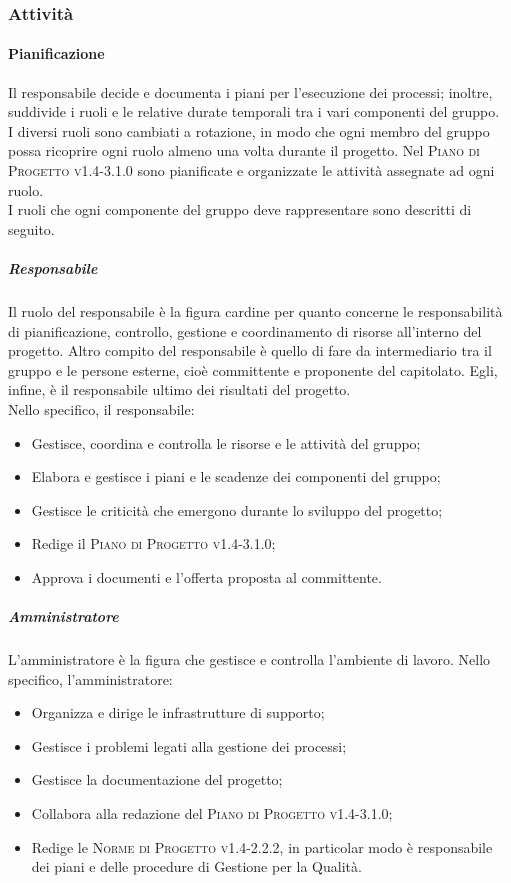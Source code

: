 \subsubsection{Attività}
\paragraph{Pianificazione}
Il responsabile decide e documenta i piani per l'esecuzione dei processi; inoltre, suddivide i ruoli e le relative durate temporali tra i vari componenti del gruppo. \\
I diversi ruoli sono cambiati a rotazione, in modo che ogni membro del gruppo possa ricoprire ogni ruolo almeno una volta durante il progetto. Nel \textsc{Piano di Progetto v1.4-3.1.0} sono pianificate e organizzate le attività assegnate ad ogni ruolo. \\
I ruoli che ogni componente del gruppo deve rappresentare sono descritti di seguito.
\subparagraph{Responsabile}
Il ruolo del responsabile è la figura cardine per quanto concerne le responsabilità di pianificazione, controllo, gestione e coordinamento di risorse all'interno del progetto. Altro compito del responsabile è quello di fare da intermediario tra il gruppo e le persone esterne, cioè committente e proponente del capitolato. Egli, infine, è il responsabile ultimo dei risultati del progetto. \\
Nello specifico, il responsabile:
\begin{itemize}
  \item Gestisce, coordina e controlla le risorse e le attività del gruppo;
  \item Elabora e gestisce i piani e le scadenze dei componenti del gruppo;
  \item Gestisce le criticità che emergono durante lo sviluppo del progetto;
  \item Redige il \textsc{Piano di Progetto v1.4-3.1.0};
  \item Approva i documenti e l'offerta proposta al committente.
\end{itemize}

\subparagraph{Amministratore}
L'amministratore è la figura che gestisce e controlla l'ambiente di lavoro. Nello specifico, l'amministratore:
\begin{itemize}
  \item Organizza e dirige le infrastrutture di supporto;
  \item Gestisce i problemi legati alla gestione dei processi;
  \item Gestisce la documentazione del progetto;
  \item Collabora alla redazione del \textsc{Piano di Progetto v1.4-3.1.0};
  \item Redige le \textsc{Norme di Progetto v1.4-2.2.2}, in particolar modo è responsabile dei piani e delle procedure di Gestione per la Qualità.
\end{itemize}

